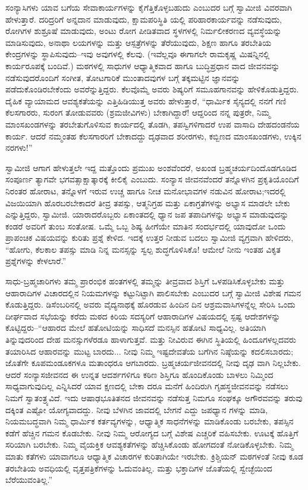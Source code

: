 ಸಂನ್ಯಾಸಿಗಳು ಯಾವ ಬಗೆಯ ಸೇವಾಕಾರ್ಯಗಳನ್ನು ಕೈಗೆತ್ತಿಕೊಳ್ಳಬಹುದು ಎಂಬುದರ ಬಗ್ಗೆ ಸ್ವಾಮೀಜಿ ವಿವರವಾಗಿ ಹೇಳುತ್ತಾರೆ. ದರಿದ್ರರಿಗೆ ಅನ್ನದಾನ ಮಾಡುವುದು, ಕ್ಷಾಮಪರಿಸ್ಥಿತಿ ಯಲ್ಲಿ ಪರಿಹಾರಕಾರ್ಯವನ್ನು ನಡೆಸುವುದು, ರೋಗಿಗಳ ಶುಶ್ರೂಷೆ ಮಾಡುವುದು, ಅಂಟು ರೋಗ ಪೀಡಿತವಾದ ಸ್ಥಳಗಳಲ್ಲಿ ನಿರ್ಮಲೀಕರಣದ ವ್ಯವಸ್ಥೆಯನ್ನು ಮಾಡಿಸುವುದು, ಅನಾಥಾ ಲಯಗಳನ್ನು ಮತ್ತು ಆಸ್ಪತ್ರೆಗಳನ್ನು ತೆರೆಯುವುದು, ಶಿಕ್ಷಣ ಹಾಗೂ ತರಬೇತಿಯ ಕೇಂದ್ರಗಳನ್ನು ಸ್ಥಾಪಿಸುವುದು–ಇವು ಅವುಗಳಲ್ಲಿ ಕೆಲವು. (ಇವೆಲ್ಲವೂ ಈಗಾಗಲೇ ರಾಮಕೃಷ್ಣ ಮಿಷನ್ನಿನಲ್ಲಿ ಕಾರ್ಯರೂಪಕ್ಕೆ ಬಂದಿವೆ.) ಮಠಗಳಲ್ಲಿ ಸಾಧುಗಳ ಆಧ್ಯಾತ್ಮಿಕವಾದ ಹಾಗೂ ಬುದ್ಧಿಪ್ರಧಾನ ವಾದ ಜೀವನವನ್ನು ನಡೆಸುವುದರೊಂದಿಗೆ ಸಂಗೀತ, ತೋಟಗಾರಿಕೆ ಮುಂತಾದವುಗಳ ಬಗ್ಗೆ ತಕ್ಕಮಟ್ಟಿನ ಜ್ಞಾನವನ್ನು ಪಡೆದುಕೊಂಡಿರಬೇಕೆಂದು ಅವರೆನ್ನುತ್ತಿದ್ದರು. ಕೆಲವೊಮ್ಮೆ ಅವರು ಶಿಷ್ಯರಿಗೆ ಸಮೂಹಗಾನವನ್ನು ಹೇಳಿಕೊಡುತ್ತಿದ್ದರು. ದೈಹಿಕ ವ್ಯಾಯಾಮದ ಆವಶ್ಯಕತೆಯನ್ನು ಎತ್ತಿಹಿಡಿಯುತ್ತ ಅವರು ಹೇಳುತ್ತಾರೆ, “ಧಾರ್ಮಿಕ ಸೈನ್ಯದಲ್ಲಿ ನನಗೆ ಗಣಿ ಕೆಲಸಗಾರರು, ಸುರಂಗ ತೋಡುವವರು (ಶ್ರಮಜೀವಿಗಳು) ಬೇಕಾಗಿದ್ದಾರೆ! ಆದ್ದರಿಂದ ನನ್ನ ಪುತ್ರರೇ, ನಿಮ್ಮ ಮಾಂಸಖಂಡಗಳನ್ನು ತರಬೇತುಗೊಳಿಸುವ ಕಾರ್ಯದಲ್ಲಿ ತೊಡಗಿ, ತಪಸ್ವಿಗಳಿಗಾದರೆ ಉಪ ವಾಸಾದಿ ದೇಹದಂಡನೆಯ ಕಾರ್ಯ. ಆದರೆ ನಮ್ಮಂತಹ ಕೆಲಸಗಾರರಿಗೆ ಬೇಕಾದದ್ದು ದೃಢವಾದ ಶರೀರಗಳು, ಕಬ್ಬಿಣದ ಮಾಂಸಖಂಡಗಳು, ಉಕ್ಕಿನ ನರಗಳು!”

ಸ್ವಾಮೀಜಿ ಆಗಾಗ ಹೇಳುತ್ತಲೇ ಇದ್ದ ಮತ್ತೊಂದು ಪ್ರಮುಖ ಅಂಶವೆಂದರೆ, ಅಖಂಡ ಬ್ರಹ್ಮಚರ್ಯದಿಂದೊಡಗೂಡಿದ ಸಂಪೂರ್ಣ ತ್ಯಾಗವೇ ಭಗವತ್ಸಾಕ್ಷಾತ್ಕಾರಕ್ಕೆ ಕೀಲಿಕೈ ಎಂಬುದು. ಸಂನ್ಯಾಸ ಜೀವನವೆಂದರೆ ತನ್ನೊಳಗಿನ ಪ್ರಕೃತಿಯೊಂದಿಗೆ ನಿರಂತರ ಹೋರಾಟ, ತನ್ನೊಳಗೆ ಇರುವ ಉಚ್ಚ ಹಾಗೂ ನೀಚ ಮನೋಭಾವಗಳ ನಡುವಿನ ಹೋರಾಟ;ಇದರಲ್ಲಿ ವಿಜಯಿಯಾಗಿ ಹೊರಬರಬೇಕಾದರೆ ತೀವ್ರ ತಪಸ್ಸು, ಆತ್ಮನಿಗ್ರಹ ಮತ್ತು ಏಕಾಗ್ರತೆಗಳನ್ನು ಅಭ್ಯಾಸ ಮಾಡಲೇ ಬೇಕು ಎನ್ನುತ್ತಿದ್ದರು, ಸ್ವಾಮೀಜಿ. ಯಾರಾದರೊಬ್ಬರು ಏಕಾಂತದಲ್ಲಿ ಧ್ಯಾನ ಜಪ ತಪಾದಿಗಳನ್ನು ಅಭ್ಯಾಸ ಮಾಡುವುದನ್ನು ಕಂಡರೆ ಅವರಿಗೆ ತುಂಬ ಸಂತೋಷ. ಒಮ್ಮೆ ಒಬ್ಬ ಶಿಷ್ಯ ಹೀಗೆಯೇ ಮಾತಿನ ಸಂದರ್ಭದಲ್ಲಿ ಯಾವುದೋ ಒಂದು ಪ್ರಾಪಂಚಿಕ ವಿಷಯವನ್ನು ಕುರಿತು ಪ್ರಶ್ನೆ ಕೇಳಿದ. ಇದಕ್ಕೆ ಉತ್ತರ ನೀಡುವ ಬದಲು ಸ್ವಾಮೀಜಿ ವ್ಯಗ್ರವಾಗಿ ಹೇಳಿದರು, “ಹೋಗು, ಕೆಲಕಾಲ ತಪಸ್ಸು ಮಾಡಿ ನಿನ್ನ ಮನಸ್ಸನ್ನು ಸ್ವಲ್ಪ ಶುದ್ಧಗೊಳಿಸಿಕೊ! ಆಮೇಲೆ ನೀನು ಇಂತಹ ವಿಕೃತ ಪ್ರಶ್ನೆಗಳನ್ನು ಕೇಳಲಾರೆ.”

ಸಾಧು-ಬ್ರಹ್ಮಚಾರಿಗಳು ತಮ್ಮ ಪ್ರಾರಂಭಿಕ ಹಂತಗಳಲ್ಲಿ ತಮ್ಮನ್ನು ತೀವ್ರವಾದ ಶಿಸ್ತಿಗೆ ಒಳಪಡಿಸಿಕೊಳ್ಳಬೇಕು ಮತ್ತು ಆಹಾರಾದಿಗಳ ವಿಚಾರದಲ್ಲಿನ ನಿಯಮಗಳನ್ನು ಕಟ್ಟುನಿಟ್ಟಾಗಿ ಪಾಲಿಸಬೇಕು ಎಂಬುದರ ಬಗ್ಗೆ ಸ್ವಾಮೀಜಿ ವಿಶೇಷ ಗಮನ ಕೊಡುತ್ತಿದ್ದರು. ಡಿಸೆಂಬರಿನಲ್ಲಿ ಅವರು ವೈದ್ಯನಾಥಕ್ಕೆ ಹೊರಡುವ ಹಿಂದಿನ ದಿನ ಆಶ್ರಮವಾಸಿಗಳನ್ನೆಲ್ಲ ಸೇರಿಸಿ ಒಂದು ದೀರ್ಘವಾದ ಸಭೆಯನ್ನು ಕರೆದು ಮಠದ ಕಿರಿಯ ಸದಸ್ಯರಿಗೆ ಆಹಾರಾದಿಗಳ ವಿಷಯದಲ್ಲಿ ಸ್ಪಷ್ಟ ಆದೇಶಗಳನ್ನು ಕೊಟ್ಟಿದ್ದರು–“ಆಹಾರದ ಮೇಲೆ ಹತೋಟಿಯನ್ನು ಸಾಧಿಸದೆ ಮನಸ್ಸಿನ ಹತೋಟಿ ಸಾಧ್ಯವಿಲ್ಲ. ಅತಿಯಾಗಿ ತಿನ್ನುವುದರಿಂದ ದೇಹ ಮನಸ್ಸುಗಳೆರಡೂ ಹಾಳಾಗುತ್ತವೆ. ಮತ್ತು ನೀವಿರುವ ಈಗಿನ ಸ್ಥಿತಿಯಲ್ಲಿ ಹಿಂದೂಗಳಲ್ಲದವರು ತಯಾರಿಸಿದ ಆಹಾರವನ್ನು ಮುಟ್ಟ ಬಾರದು... ನೀವು ನಿಮ್ಮ ಇಷ್ಟದೇವತೆಯ ಬಗೆಗಿನ ನಿಷ್ಠೆಯನ್ನು ಕದಲಿಸಬಾರದು; ಜೊತೆಗೇ ಕೂಪಮಂಡೂಕಗಳೂ ಮತಾಂಧರೂ ಆಗಬಾರದು. ಬ್ರಹ್ಮಚರ್ಯಜೀವನದಲ್ಲಿ ನೀವು ದೃಢ ವಾಗಿ ನಿಲ್ಲಬೇಕು. ಆದರೆ ಸಂನ್ಯಾಸಜೀವನದ ಈ ಉನ್ನತ ಆದರ್ಶಗಳಿಗೂ ಕಠಿಣ ಶಿಸ್ತಿಗೂ ಹೊಂದಿಕೊಂಡು ಬಾಳಲು ನಿಮ್ಮಿಂದ ಸಾಧ್ಯವಾಗುವುದಿಲ್ಲ ಎನ್ನಿಸಿದರೆ ಯಾವ ಕ್ಷಣದಲ್ಲಿ ಬೇಕಾ ದರೂ ಮನೆಗೆ ಹಿಂದಿರುಗಿ ಗೃಹಸ್ಥಜೀವನವನ್ನು ನಡೆಸಲು ನಿಮಗೆ ಸ್ವಾತಂತ್ರ್ಯವಿದೆ. ಇದು ಆಷಾಢಭೂತಿತನದ ಜೀವನವನ್ನು ನಡೆಸುತ್ತ ನಿಮಗೂ ಸಂಘಕ್ಕೂ ಅಗೌರವವನ್ನು ತರುವು ದಕ್ಕಿಂತ ಎಷ್ಟೋ ಯೋಗ್ಯವಾದದ್ದು. ನೀವು ಬೆಳಗಿನ ಜಾವದಲ್ಲಿ ಬೇಗನೆ ಎದ್ದು ಜಪಧ್ಯಾನ ಗಳನ್ನು ಮಾಡಿ, ನಿಯಮಬದ್ಧವಾಗಿ ನಿಮ್ಮ ಧಾರ್ಮಿಕ ಕರ್ತವ್ಯಗಳನ್ನು, ಆಧ್ಯಾತ್ಮಿಕ ಸಾಧನೆಗಳನ್ನು ಮಾಡಿಕೊಂಡು ಬರಬೇಕು, ತಪಸ್ಸಿನ ಕಡೆಗೆ ಹೆಚ್ಚಿನ ಗಮನ ಕೊಡಬೇಕು. ನೀವು ನಿಮ್ಮ ಆರೋಗ್ಯದ ಬಗ್ಗೆ ವಿಶೇಷ ಎಚ್ಚರಿಕೆ ವಹಿಸಬೇಕು. ಊಟಕ್ಕೆ ಹೊತ್ತಿಗೆ ಸರಿಯಾಗಿ ಬರಬೇಕು. ನಿಮ್ಮ ವೈಯಕ್ತಿಕ ಆವಶ್ಯಕತೆಗಳನ್ನು ಹೆಚ್ಚಿಸಿಕೊಂಡು ಹೋಗದಂತೆ ನೋಡಿಕೊಳ್ಳಬೇಕು. ನಿಮ್ಮ ಮಾತು ಕತೆಗಳು ಯಾವಾಗಲೂ ಆಧ್ಯಾತ್ಮಿಕ ವಿಚಾರಗಳ ಕುರಿತಾಗಿಯೇ ಇರಬೇಕು. ಕ್ರಿಶ್ಚಿಯನ್ ಮಠಗಳಂತೆ ನೀವು ಕೂಡ ತರಬೇತಿಯ ಅವಧಿಯಲ್ಲಿ ವೃತ್ತಪತ್ರಿಕೆಗಳನ್ನು ಓದುವಂತಿಲ್ಲ. ಮತ್ತು ಭಕ್ತಾದಿಗಳ ಜೊತೆಯಲ್ಲಿ ಸ್ವೇಚ್ಛೆಯಿಂದ ಬೆರೆಯುವಂತಿಲ್ಲ.”

